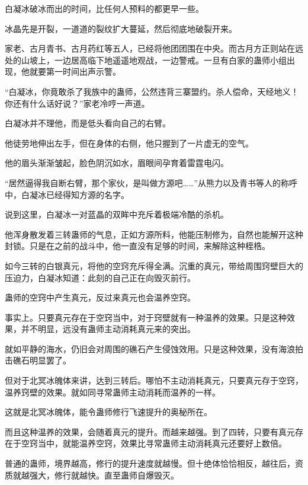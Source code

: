 
\begin{this_body}



白凝冰破冰而出的时间，比任何人预料的都更早一些。

冰晶先是开裂，一道道的裂纹扩大蔓延，然后彻底地破裂开来。

家老、古月青书、古月药红等五人，已经将他团团围在中央。而古月方正则站在远处的山坡上，一边居高临下地遥遥地观战，一边警戒。一旦有白家的蛊师小组出现，他就要第一时间出声示警。

“白凝冰，你竟敢杀了我族中的蛊师，公然违背三寨盟约。杀人偿命，天经地义！你还有什么话好说？”家老冷哼一声道。

白凝冰并不理他，而是低头看向自己的右臂。

他徒劳地伸出左手，但在身体的右侧，他只握到了一片虚无的空气。

他的眉头渐渐皱起，脸色阴沉如水，眉眼间孕育着雷霆电闪。

“居然逼得我自断右臂，那个家伙，是叫做方源吧……”从熊力以及青书等人的称呼中，白凝冰已经得知方源的名字。

说到这里，白凝冰一对蓝晶的双眸中充斥着极端冷酷的杀机。

他浑身散发着三转蛊师的气息，正如方源所料，他能压制修为，自然也能解开这种封锁。只是在之前的战斗中，他一直没有足够的时间，来解除这种桎梏。

如今三转的白银真元，将他的空窍充斥得全满。沉重的真元，带给周围窍壁巨大的压迫力，白凝冰知道：此刻的自己正在向毁灭前行。

蛊师的空窍中产生真元，反过来真元也会温养空窍。

事实上。只要真元存在于空窍当中，对于窍壁就有一种温养的效果。只是这种效果，并不明显，远没有蛊师主动消耗真元来的突出。

就如平静的海水，仍旧会对周围的礁石产生侵蚀效用。只是这种效果，没有海浪拍击礁石明显罢了。

但对于北冥冰魄体来讲，达到三转后。哪怕不主动消耗真元，只要真元存于空窍，温养窍壁的效果。就如同寻常蛊师主动消耗而温养的一样。

这就是北冥冰魄体，能令蛊师修行飞速提升的奥秘所在。

而且这种温养的效果，会随着真元的提升。而越来越强。到了四转，只要有真元存在于空窍当中，就能温养空窍，效果比寻常蛊师主动消耗真元还要好上数倍。

普通的蛊师，境界越高，修行的提升速度就越慢。但十绝体恰恰相反，越往后，资质就越强大，修行就越快。直至蛊师自爆毁灭。


\end{this_body}
